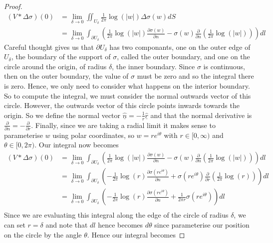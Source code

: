 \documentclass[11pt]{report}
\theoremstyle{definition}
\begin{document}
\begin{proof}
  \begin{align*}
    (V * \Delta \sigma)(0) &= \lim_{\delta \rightarrow 0} \iint_{U_{\delta}} \frac{1}{2\pi}\log(|w|)\Delta\sigma(w) dS \\
    &= \lim_{\delta \rightarrow 0} \int_{\partial U_{\delta}}\left(\frac{1}{2\pi}\log(|w|)\frac{\partial \sigma(w)}{\partial n} - \sigma(w)\frac{\partial}{\partial n}\left(\frac{1}{2\pi}\log(|w|)\right)\right)dl
  \end{align*}
  Careful thought gives us that $\partial U_{\delta}$ has two componants, one on the outer edge of $U_{\delta}$, the boundary of the support of $\sigma$, called the outer boundary, and one on the circle around the origin, of radius $\delta$, the inner boundary. Since $\sigma$ is continuous, then on the outer boundary, the value of $\sigma$ must be zero and so the integral there is zero. Hence, we only need to consider what happens on the interior boundary. So to compute the integral, we must consider the normal outwards vector of this circle. However, the outwards vector of this circle points inwards towards the origin. So we define the normal vector $\hat{\underline{n}}= -\frac{1}{r}\hat{\underline{r}}$ and that the normal derivative is $\frac{\partial}{\partial n} = -\frac{\partial}{\partial r}$.
  Finally, since we are taking a radial limit it makes sense to parameterise $w$ using polar coordinates, so $w=re^{i\theta}$ with $r\in [0, \infty)$ and $\theta \in [0, 2\pi)$. Our integral now becomes
  \begin{align*}
    (V * \Delta \sigma)(0) &= \lim_{\delta \rightarrow 0} \int_{\partial U_{\delta}}\left(\frac{1}{2\pi}\log(|w|)\frac{\partial \sigma(w)}{\partial n} - \sigma(w)\frac{\partial}{\partial n}\left(\frac{1}{2\pi}\log(|w|)\right)\right)dl \\
    &= \lim_{\delta \rightarrow 0} \int_{\partial U_{\delta}}\left( -\frac{1}{2\pi}\log(r)\frac{\partial \sigma(re^{i\theta})}{\partial n} + \sigma(re^{i\theta})\frac{\partial}{\partial r}\left(\frac{1}{2\pi}\log(r)\right)\right)dl \\
    &= \lim_{\delta \rightarrow 0} \int_{\partial U_{\delta}}\left( -\frac{1}{2\pi}\log(r)\frac{\partial \sigma(re^{i\theta})}{\partial n} + \frac{1}{2\pi r}\sigma(re^{i\theta})\right)dl \\
  \end{align*}
  Since we are evaluating this integral along the edge of the circle of radius $\delta$, we can set $r=\delta$ and note that $dl$ hence becomes $d\theta$ since parameterise our position on the circle by the angle $\theta$. Hence our integral becomes

\end{proof}
\end{document}
